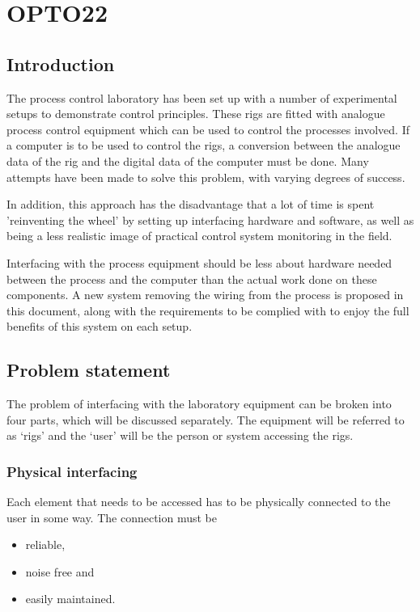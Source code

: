 \chapter{OPTO22}

\section{Introduction}
The process control laboratory has been set up with a number of experimental setups to demonstrate control principles.  These rigs are fitted with analogue process control equipment which can be used to control the processes involved.  If a computer is to be used to control the rigs, a conversion between the analogue data of the rig and the digital data of the computer must be done.  Many attempts have been made to solve this problem, with varying degrees of success.  

In addition, this approach has the disadvantage that a lot of time is spent 'reinventing the wheel' by setting up interfacing hardware and software, as well as being a less realistic image of practical control system monitoring in the field.

Interfacing with the process equipment should be less about hardware needed between the process and the computer than the actual work done on these components.  A new system removing the wiring from the process is proposed in this document, along with the requirements to be complied with to enjoy the full benefits of this system on each setup.

\section{Problem statement}
The problem of interfacing with the laboratory equipment can be broken into four parts, which will be discussed separately.  The equipment will be referred to as `rigs' and the `user' will be the person or system accessing the rigs.
\subsection{Physical interfacing}
Each element that needs to be accessed has to be physically connected to the user in some way.  The connection must be 
\begin{itemize}
	\item reliable,
	\item noise free and
	\item easily maintained.
\end{itemize}
	
